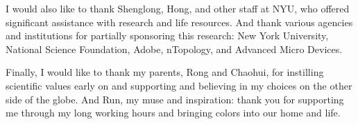 I would also like to thank Shenglong, Hong, and other staff at NYU, who offered significant assistance with research and life resources. And thank various agencies and institutions for partially sponsoring this research: New York University, National Science Foundation, Adobe, nTopology, and Advanced Micro Devices.

Finally, I would like to thank my parents, Rong and Chaohui, for instilling scientific values early on and supporting and believing in my choices on the other side of the globe.
And Run, my muse and inspiration: thank you for supporting me through my long working hours and bringing colors into our home and life.
